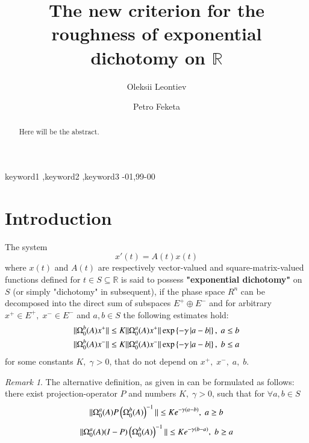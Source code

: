 \documentclass{elsarticle}
\theoremstyle{remark}
\newtheorem{remark}{Remark}
\begin{document}
\begin{frontmatter}

\title{The new criterion for the roughness of exponential dichotomy on $\mathbb{R}$}

\author[todai]{Oleksii Leontiev}
\author[erfurt]{Petro Feketa}


\address[todai]{Tokyo University}
\address[erfurt]{University of Erfurt}

\begin{abstract}
Here will be the abstract.
\end{abstract}

\begin{keyword}
keyword1 \sep keyword2 \sep keyword3
-01\sep  99-00
\end{keyword}

\end{frontmatter}

\linenumbers

\section{Introduction}
The system 
\[x'(t)=A(t)x(t)\]
where $x(t)$ and $A(t)$ are respectively vector-valued and square-matrix-valued functions defined for $t\in S\subseteq\mathbb{R}$
is said to possess \textbf{"exponential dichotomy"} on $S$ (or simply "dichotomy" in subsequent), if the phase space $R^n$
can be decomposed into the direct sum of subspaces
$E^+\oplus E^-$ and for arbitrary $x^+\in E^+,\; x^-\in E^-$ and $a,b\in S$ the following estimates hold:
\begin{equation}\begin{aligned}\label{DichotomyDef}
	\|\Omega^b_0(A)x^+\|\leq K\|\Omega_0^a(A)x^+\|\exp\left\{-\gamma\left|a-b\right|\right\},\;a\leq b\\
	\|\Omega^b_0(A)x^-\|\leq K\|\Omega_0^a(A)x^-\|\exp\left\{-\gamma\left|a-b\right|\right\},\;b\leq a\\
\end{aligned}\end{equation}
for some constants $K,\;\gamma>0$, that do not depend on $x^+,\;x^-,\;a,\;b$.

\begin{remark}The alternative definition, as given in \cite{coppel1978dichotomies} can be formulated as follows: there exist projection-operator $P$ and numbers
$K,\;\gamma>0$, such that
 for $\forall a,b\in S$
\[\|\Omega_0^a(A)P\left(\Omega_0^b(A)\right)^{-1}\|\leq K e^{-\gamma(a-b)},\;a\geq b\]
\[\|\Omega_0^a(A)(I-P)\left(\Omega_0^b(A)\right)^{-1}\|\leq K e^{-\gamma(b-a)},\;b\geq a\]
\end{remark}
\end{document}
